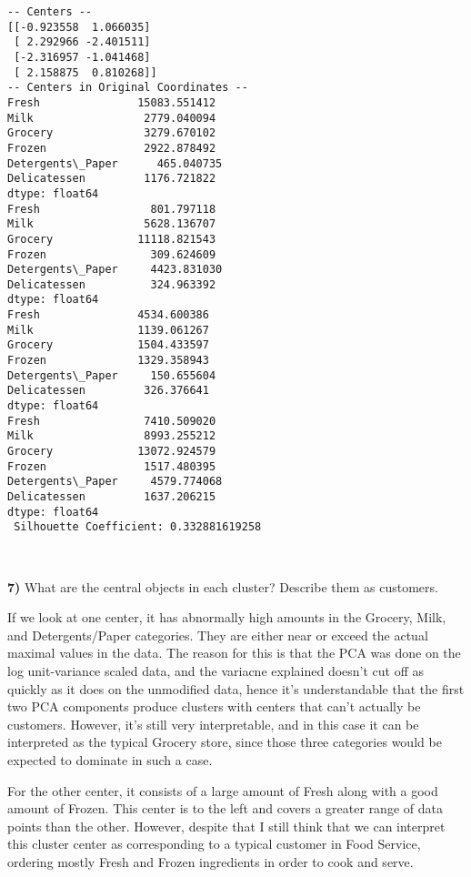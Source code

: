\documentclass{article}
\begin{document}
    \begin{Verbatim}[commandchars=\\\{\}]
-- Centers --
[[-0.923558  1.066035]
 [ 2.292966 -2.401511]
 [-2.316957 -1.041468]
 [ 2.158875  0.810268]]
-- Centers in Original Coordinates --
Fresh               15083.551412
Milk                 2779.040094
Grocery              3279.670102
Frozen               2922.878492
Detergents\_Paper      465.040735
Delicatessen         1176.721822
dtype: float64
Fresh                 801.797118
Milk                 5628.136707
Grocery             11118.821543
Frozen                309.624609
Detergents\_Paper     4423.831030
Delicatessen          324.963392
dtype: float64
Fresh               4534.600386
Milk                1139.061267
Grocery             1504.433597
Frozen              1329.358943
Detergents\_Paper     150.655604
Delicatessen         326.376641
dtype: float64
Fresh                7410.509020
Milk                 8993.255212
Grocery             13072.924579
Frozen               1517.480395
Detergents\_Paper     4579.774068
Delicatessen         1637.206215
dtype: float64
 Silhouette Coefficient: 0.332881619258
    \end{Verbatim}

    \begin{center}
    \end{center}
    { \hspace*{\fill} \\}
    
    \textbf{7)} What are the central objects in each cluster? Describe them
as customers.

    If we look at one center, it has abnormally high amounts in the Grocery,
Milk, and Detergents/Paper categories. They are either near or exceed
the actual maximal values in the data. The reason for this is that the
PCA was done on the log unit-variance scaled data, and the variacne
explained doesn't cut off as quickly as it does on the unmodified data,
hence it's understandable that the first two PCA components produce
clusters with centers that can't actually be customers. However, it's
still very interpretable, and in this case it can be interpreted as the
typical Grocery store, since those three categories would be expected to
dominate in such a case.

For the other center, it consists of a large amount of Fresh along with
a good amount of Frozen. This center is to the left and covers a greater
range of data points than the other. However, despite that I still think
that we can interpret this cluster center as corresponding to a typical
customer in Food Service, ordering mostly Fresh and Frozen ingredients
in order to cook and serve.
\end{document}
